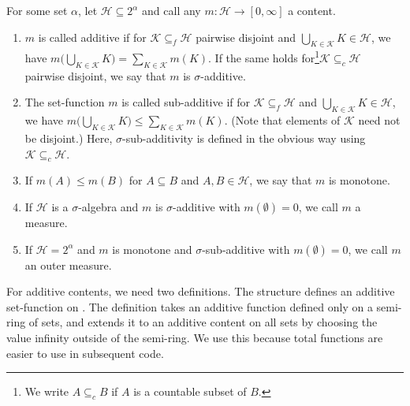 \documentclass[lean]{AFM}
\begin{document}
\begin{definition}\label{def:content}
  For some set $\alpha$, let $\mathcal H \subseteq 2^\alpha$
  and call any $m : \mathcal H \to [0,\infty]$ a
    content.
  \begin{enumerate}
  \item $m$ is called additive if for $\mathcal K \subseteq_f \mathcal
    H$ pairwise disjoint and $\bigcup_{K \in \mathcal K} K \in
    \mathcal H$, we have $m \Big(\bigcup_{K \in \mathcal K} K \Big) =
    \sum_{K \in \mathcal K} m(K)$. If the same holds for\footnote {We
      write $A \subseteq_c B$ if $A$ is a countable subset of
      $B$.}$\mathcal K \subseteq_c \mathcal H$ pairwise disjoint, we
    say that $m$ is $\sigma$-additive.
  \item The set-function $m$ is called sub-additive if for $\mathcal K
    \subseteq_f \mathcal H$ and $\bigcup_{K \in \mathcal K} K \in
    \mathcal H$, we have $m \Big(\bigcup_{K \in \mathcal K} K \Big)
    \leq \sum_{K \in \mathcal K} m(K)$. (Note that elements of
    $\mathcal K$ need not be disjoint.) Here, $\sigma$-sub-additivity
    is defined in the obvious way using $\mathcal K\subseteq_c
    \mathcal H$.
  \item If $m(A) \leq m(B)$ for $A\subseteq B$ and $A,B\in\mathcal H$,
    we say that $m$ is monotone.
  \item If $\mathcal H$ is a $\sigma$-algebra and $m$ is
    $\sigma$-additive with $m(\emptyset) = 0$, we call
    $m$ a measure.
  \item If $\mathcal H = 2^\alpha$ and $m$ is monotone and
    $\sigma$-sub-additive with $m(\emptyset)=0$, we call $m$ an outer
    measure.
  \end{enumerate}
\end{definition}

\noindent
For additive contents, we need two definitions.
The structure  defines
an additive set-function on .
The definition  takes an additive function defined only on a semi-ring of sets, and extends it to an additive content on all sets by choosing the value infinity outside of the semi-ring. We use this because total functions are easier to use in subsequent code.

\end{document}
